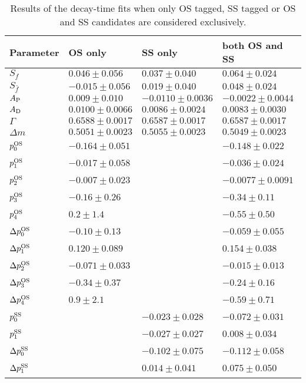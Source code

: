 \begin{table}
  \centering
  \caption{Results of the decay-time fits when only OS tagged, SS tagged or OS and SS candidates are considered exclusively.}
  \label{tab:timesplitstag}
  \begin{tabular}{llll}
    \toprule
    Parameter & OS only & SS only & both OS and SS \\
    \midrule
    $S_{f}$ & $0.046\pm0.056$ & $0.037\pm0.040$ & $0.064\pm0.024$\\
    $S_{\bar f}$ & $-0.015\pm0.056$ & $0.019\pm0.040$ & $0.048\pm0.024$\\
    \midrule
    $A_{\rm P}$ & $0.009\pm0.010$ & $-0.0110\pm0.0036$ & $-0.0022\pm0.0044$\\
    $A_{\rm D}$ & $0.0100\pm0.0066$ & $0.0086\pm0.0024$ & $0.0083\pm0.0030$\\
    \midrule
    $\Gamma$ & $0.6588\pm0.0017$ & $0.6587\pm0.0017$ & $0.6587\pm0.0017$\\
    $\Delta m$ & $0.5051\pm0.0023$ & $0.5055\pm0.0023$ & $0.5049\pm0.0023$\\
    \midrule
    $p_{0}^{\rm OS}$ & $-0.164\pm0.051$ & \ & $-0.148\pm0.022$\\
    $p_{1}^{\rm OS}$ & $-0.017\pm0.058$ & \ & $-0.036\pm0.024$\\
    $p_{2}^{\rm OS}$ & $-0.007\pm0.023$ & \ & $-0.0077\pm0.0091$\\
    $p_{3}^{\rm OS}$ & $-0.16\pm0.26$ & \ & $-0.34\pm0.11$\\
    $p_{4}^{\rm OS}$ & $0.2\pm1.4$ & \ & $-0.55\pm0.50$\\
    $\Delta p_{0}^{\rm OS}$ & $-0.10\pm0.13$ & \ & $-0.059\pm0.055$\\
    $\Delta p_{1}^{\rm OS}$ & $0.120\pm0.089$ & \ & $0.154\pm0.038$\\
    $\Delta p_{2}^{\rm OS}$ & $-0.071\pm0.033$ & \ & $-0.015\pm0.013$\\
    $\Delta p_{3}^{\rm OS}$ & $-0.34\pm0.37$ & \ & $-0.24\pm0.16$\\
    $\Delta p_{4}^{\rm OS}$ & $0.9\pm2.1$ & \ & $-0.59\pm0.71$\\
    \midrule
    $p_{0}^{\rm SS}$ & \ & $-0.023\pm0.028$ & $-0.072\pm0.031$\\
    $p_{1}^{\rm SS}$ & \ & $-0.027\pm0.027$ & $0.008\pm0.034$\\
    $\Delta p_{0}^{\rm SS}$ & \ & $-0.102\pm0.075$ & $-0.112\pm0.058$\\
    $\Delta p_{1}^{\rm SS}$ & \ & $0.014\pm0.041$ & $0.075\pm0.050$\\

\end{tabular}
\end{table}

